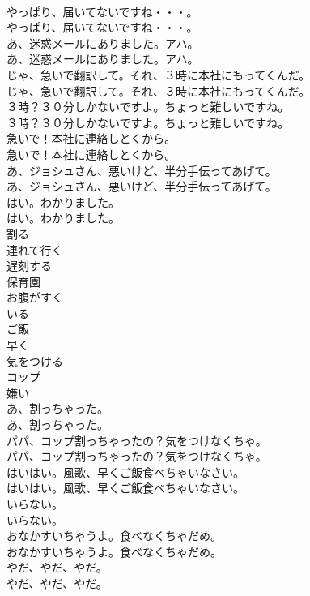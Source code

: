 \documentclass[8pt]{extreport}
\begin{document}
\begin{CJK}{UTF8}{min}
\\	やっぱり、届いてないですね・・・。	
\\	やっぱり、届いてないですね・・・。 
\\	あ、迷惑メールにありました。アハ。	
\\	あ、迷惑メールにありました。アハ。 
\\	じゃ、急いで翻訳して。それ、３時に本社にもってくんだ。	
\\	じゃ、急いで翻訳して。それ、３時に本社にもってくんだ。 
\\	３時？３０分しかないですよ。ちょっと難しいですね。	
\\	３時？３０分しかないですよ。ちょっと難しいですね。 
\\	急いで！本社に連絡しとくから。	
\\	急いで！本社に連絡しとくから。 
\\	あ、ジョシュさん、悪いけど、半分手伝ってあげて。	
\\	あ、ジョシュさん、悪いけど、半分手伝ってあげて。 
\\	はい。わかりました。	
\\	はい。わかりました。 
\\	割る
\\	連れて行く
\\	遅刻する
\\	保育園
\\	お腹がすく
\\	いる
\\	ご飯
\\	早く
\\	気をつける
\\	コップ
\\	嫌い
\\	あ、割っちゃった。	
\\	あ、割っちゃった。 
\\	パパ、コップ割っちゃったの？気をつけなくちゃ。	
\\	パパ、コップ割っちゃったの？気をつけなくちゃ。 
\\	はいはい。風歌、早くご飯食べちゃいなさい。	
\\	はいはい。風歌、早くご飯食べちゃいなさい。 
\\	いらない。	
\\	いらない。 
\\	おなかすいちゃうよ。食べなくちゃだめ。	
\\	おなかすいちゃうよ。食べなくちゃだめ。 
\\	やだ、やだ、やだ。	
\\	やだ、やだ、やだ。 

\end{CJK}
\end{document}
